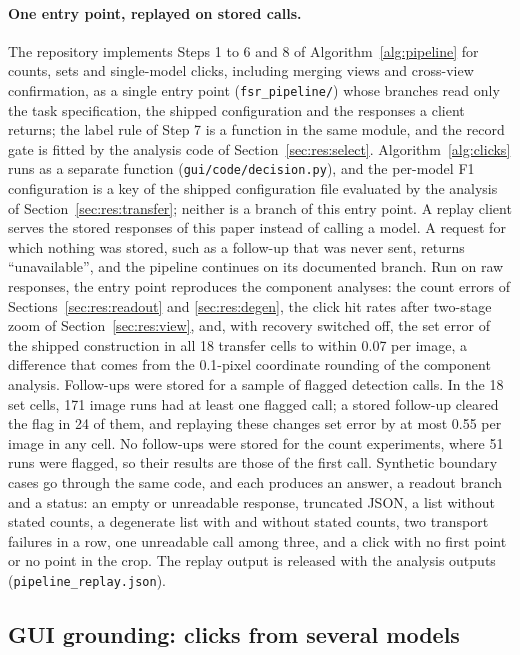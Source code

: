 \paragraph{One entry point, replayed on stored calls.} The repository implements Steps 1 to 6 and 8 of Algorithm~\ref{alg:pipeline} for counts, sets and single-model clicks, including merging views and cross-view confirmation, as a single entry point (\texttt{fsr\_pipeline/}) whose branches read only the task specification, the shipped configuration and the responses a client returns; the label rule of Step 7 is a function in the same module, and the record gate is fitted by the analysis code of Section~\ref{sec:res:select}. Algorithm~\ref{alg:clicks} runs as a separate function (\texttt{gui/code/decision.py}), and the per-model F1 configuration is a key of the shipped configuration file evaluated by the analysis of Section~\ref{sec:res:transfer}; neither is a branch of this entry point. A replay client serves the stored responses of this paper instead of calling a model. A request for which nothing was stored, such as a follow-up that was never sent, returns ``unavailable'', and the pipeline continues on its documented branch. Run on raw responses, the entry point reproduces the component analyses: the count errors of Sections~\ref{sec:res:readout} and \ref{sec:res:degen}, the click hit rates after two-stage zoom of Section~\ref{sec:res:view}, and, with recovery switched off, the set error of the shipped construction in all 18 transfer cells to within 0.07 per image, a difference that comes from the 0.1-pixel coordinate rounding of the component analysis. Follow-ups were stored for a sample of flagged detection calls. In the 18 set cells, 171 image runs had at least one flagged call; a stored follow-up cleared the flag in 24 of them, and replaying these changes set error by at most 0.55 per image in any cell. No follow-ups were stored for the count experiments, where 51 runs were flagged, so their results are those of the first call. Synthetic boundary cases go through the same code, and each produces an answer, a readout branch and a status: an empty or unreadable response, truncated JSON, a list without stated counts, a degenerate list with and without stated counts, two transport failures in a row, one unreadable call among three, and a click with no first point or no point in the crop. The replay output is released with the analysis outputs (\texttt{pipeline\_replay.json}).

\subsection{GUI grounding: clicks from several models}\label{sec:method:clicks}

